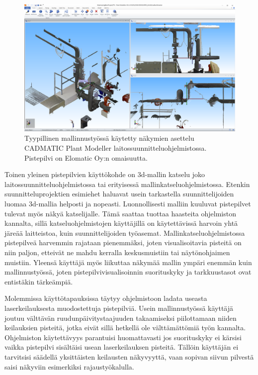 \begin{figure}
    \centering
    \includegraphics[width=\textwidth]{img/näkymät2.png}
    \caption{Tyypillinen mallinnustyössä käytetty näkymien asettelu CADMATIC Plant Modeller laitossuunnitteluohjelmistossa. Pistepilvi on Elomatic Oy:n omaisuutta.}
    \label{img:views}
\end{figure}


Toinen yleinen pistepilvien käyttökohde on 3d-mallin katselu joko laitossuunnitteluohjelmistossa tai erityisessä mallinkatseluohjelmistossa. Etenkin suunnitteluprojektien esimiehet haluavat usein tarkastella suunnittelijoiden luomaa 3d-mallia helposti ja nopeasti. Luonnollisesti malliin kuuluvat pistepilvet tulevat myös näkyä katselijalle. Tämä saattaa tuottaa haasteita ohjelmiston kannalta, sillä katseluohjelmistojen käyttäjillä on käytettävissä harvoin yhtä järeää laitteistoa, kuin suunnittelijoiden työasemat. Mallinkatseluohjelmistossa pistepilveä harvemmin rajataan pienemmäksi, joten visualisoitavia pisteitä on niin paljon, etteivät ne mahdu kerralla keskusmuistiin tai näytönohjaimen muistiin. Yleensä käyttäjä myös liikuttaa näkymää mallin ympäri enemmän kuin mallinnustyössä, joten pistepilvivisualisoinnin suorituskyky ja tarkkuustasot ovat entistäkin tärkeämpiä.

Molemmissa käyttötapauksissa täytyy ohjelmistoon ladata useasta laserkeilauksesta muodostettuja pistepilviä. Usein mallinnustyössä käyttäjä joutuu välttävän ruudunpäivitystaajuuden takaamiseksi piilottamaan niiden keilauksien pisteitä, jotka eivät sillä hetkellä ole välttämättömiä työn kannalta. Ohjelmiston käytettävyys parantuisi huomattavasti jos suorituskyky ei kärsisi vaikka pistepilvi sisältäisi usean laserkeilauksen pisteitä. Tällöin käyttäjän ei tarvitsisi säädellä yksittäisten keilausten näkyvyyttä, vaan sopivan siivun pilvestä saisi näkyviin esimerkiksi rajaustyökalulla. 


